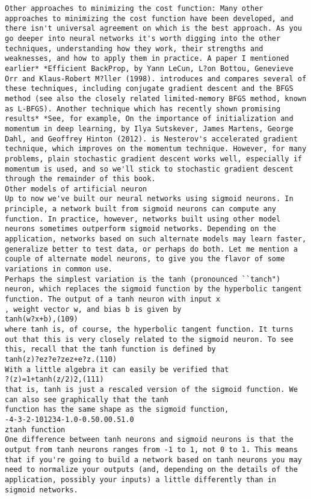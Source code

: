 \begin{lstlisting}
Other approaches to minimizing the cost function: Many other approaches to minimizing the cost function have been developed, and there isn't universal agreement on which is the best approach. As you go deeper into neural networks it's worth digging into the other techniques, understanding how they work, their strengths and weaknesses, and how to apply them in practice. A paper I mentioned earlier* *Efficient BackProp, by Yann LeCun, L?on Bottou, Genevieve Orr and Klaus-Robert M?ller (1998). introduces and compares several of these techniques, including conjugate gradient descent and the BFGS method (see also the closely related limited-memory BFGS method, known as L-BFGS). Another technique which has recently shown promising results* *See, for example, On the importance of initialization and momentum in deep learning, by Ilya Sutskever, James Martens, George Dahl, and Geoffrey Hinton (2012). is Nesterov's accelerated gradient technique, which improves on the momentum technique. However, for many problems, plain stochastic gradient descent works well, especially if momentum is used, and so we'll stick to stochastic gradient descent through the remainder of this book.
Other models of artificial neuron
Up to now we've built our neural networks using sigmoid neurons. In principle, a network built from sigmoid neurons can compute any function. In practice, however, networks built using other model neurons sometimes outperform sigmoid networks. Depending on the application, networks based on such alternate models may learn faster, generalize better to test data, or perhaps do both. Let me mention a couple of alternate model neurons, to give you the flavor of some variations in common use.
Perhaps the simplest variation is the tanh (pronounced ``tanch") neuron, which replaces the sigmoid function by the hyperbolic tangent function. The output of a tanh neuron with input x
, weight vector w, and bias b is given by 
tanh(w?x+b),(109)
where tanh is, of course, the hyperbolic tangent function. It turns out that this is very closely related to the sigmoid neuron. To see this, recall that the tanh function is defined by 
tanh(z)?ez?e?zez+e?z.(110)
With a little algebra it can easily be verified that 
?(z)=1+tanh(z/2)2,(111)
that is, tanh is just a rescaled version of the sigmoid function. We can also see graphically that the tanh
function has the same shape as the sigmoid function,
-4-3-2-101234-1.0-0.50.00.51.0
ztanh function
One difference between tanh neurons and sigmoid neurons is that the output from tanh neurons ranges from -1 to 1, not 0 to 1. This means that if you're going to build a network based on tanh neurons you may need to normalize your outputs (and, depending on the details of the application, possibly your inputs) a little differently than in sigmoid networks.

\end{lstlisting}
